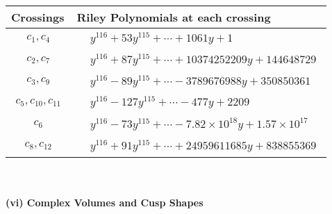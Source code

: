 \documentclass[1p]{elsarticle_modified}
\theoremstyle{definition}
\begin{document}
\begin{tabular}{m{50pt}|m{274pt}}
Crossings & \hspace{64pt}Riley Polynomials at each crossing \\
\hline $$\begin{aligned}c_{1},c_{4}\end{aligned}$$&$\begin{aligned}
&y^{116}+53 y^{115}+\cdots+1061 y+1
\end{aligned}$\\
\hline $$\begin{aligned}c_{2},c_{7}\end{aligned}$$&$\begin{aligned}
&y^{116}+87 y^{115}+\cdots+10374252209 y+144648729
\end{aligned}$\\
\hline $$\begin{aligned}c_{3},c_{9}\end{aligned}$$&$\begin{aligned}
&y^{116}-89 y^{115}+\cdots-3789676988 y+350850361
\end{aligned}$\\
\hline $$\begin{aligned}c_{5},c_{10},c_{11}\end{aligned}$$&$\begin{aligned}
&y^{116}-127 y^{115}+\cdots-477 y+2209
\end{aligned}$\\
\hline $$\begin{aligned}c_{6}\end{aligned}$$&$\begin{aligned}
&y^{116}-73 y^{115}+\cdots-7.82\times10^{18} y+1.57\times10^{17}
\end{aligned}$\\
\hline $$\begin{aligned}c_{8},c_{12}\end{aligned}$$&$\begin{aligned}
&y^{116}+91 y^{115}+\cdots+24959611685 y+838855369
\end{aligned}$\\
\hline
\end{tabular}\\~\\
\newpage\flushleft \textbf{(vi) Complex Volumes and Cusp Shapes}
\end{document}
